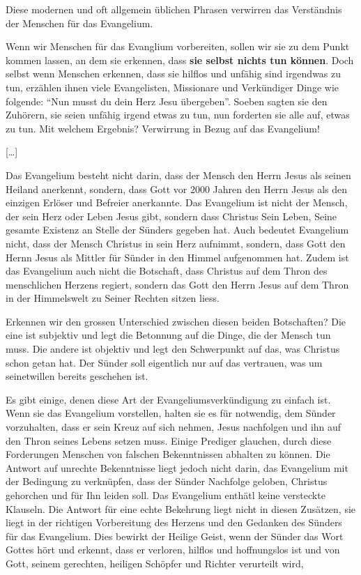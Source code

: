 \documentclass[
  12pt,
]{krantz}
\begin{document}
Diese modernen und oft allgemein üblichen Phrasen verwirren das Verständnis
der Menschen für das Evangelium.

Wenn wir Menschen für das Evanglium vorbereiten, sollen wir sie zu dem Punkt
kommen lassen, an dem sie erkennen, dass \textbf{sie selbst nichts tun können}. Doch
selbst wenn Menschen erkennen, dass sie hilflos und unfähig sind irgendwas zu
tun, erzählen ihnen viele Evangelisten, Missionare und Verkündiger Dinge wie
folgende: ``Nun musst du dein Herz Jesu übergeben''. Soeben sagten sie den
Zuhörern, sie seien unfähig irgend etwas zu tun, nun forderten sie alle auf,
etwas zu tun. Mit welchem Ergebnis? Verwirrung in Bezug auf das Evangelium!

{[}\ldots{]}

Das Evangelium besteht nicht darin, dass der Mensch den Herrn Jesus als seinen
Heiland anerkennt, sondern, dass Gott vor 2000 Jahren den Herrn Jesus als den
einzigen Erlöser und Befreier anerkannte. Das Evangelium ist nicht der Mensch,
der sein Herz oder Leben Jesus gibt, sondern dass Christus Sein Leben, Seine
gesamte Existenz an Stelle der Sünders gegeben hat. Auch bedeutet Evangelium
nicht, dass der Mensch Christus in sein Herz aufnimmt, sondern, dass Gott
den Hernn Jesus als Mittler für Sünder in den Himmel aufgenommen hat. Zudem ist
das Evangelium auch nicht die Botschaft, dass Christus auf dem Thron des
menschlichen Herzens regiert, sondern das Gott den Herrn Jesus auf dem Thron
in der Himmelswelt zu Seiner Rechten sitzen liess.

Erkennen wir den grossen Unterschied zwischen diesen beiden Botschaften? Die
eine ist subjektiv und legt die Betonnung auf die Dinge, die der Mensch tun
muss. Die andere ist objektiv und legt den Schwerpunkt auf das, was Christus
schon getan hat. Der Sünder soll eigentlich nur auf das vertrauen, was um
seinetwillen bereits geschehen ist.

Es gibt einige, denen diese Art der Evangeliumsverkündigung zu einfach ist.
Wenn sie das Evangelium vorstellen, halten sie es für notwendig, dem Sünder
vorzuhalten, dass er sein Kreuz auf sich nehmen, Jesus nachfolgen und ihn auf
den Thron seines Lebens setzen muss. Einige Prediger glauchen, durch diese
Forderungen Menschen von falschen Bekenntnissen abhalten zu können. Die Antwort
auf unrechte Bekenntnisse liegt jedoch nicht darin, das Evangelium mit der
Bedingung zu verknüpfen, dass der Sünder Nachfolge geloben, Christus gehorchen
und für Ihn leiden soll. Das Evangelium enthätl keine versteckte Klauseln.
Die Antwort für eine echte Bekehrung liegt nicht in diesen Zusätzen, sie liegt
in der richtigen Vorbereitung des Herzens und den Gedanken des Sünders für
das Evangelium. Dies bewirkt der Heilige Geist, wenn der Sünder das Wort Gottes
hört und erkennt, dass er verloren, hilflos und hoffnungslos ist und von Gott,
seinem gerechten, heiligen Schöpfer und Richter verurteilt wird,
\end{document}
